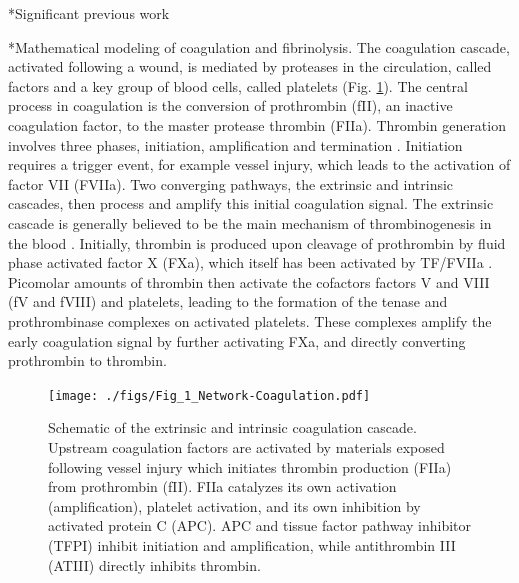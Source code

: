 \documentclass[11pt]{article}
\makeatletter
\renewcommand\subsection{\@startsection
	{subsection}{2}{0mm}
	{-0.05in}
	{-0.5\baselineskip}
	{\normalfont\normalsize\bfseries}}
\renewcommand\section{\@startsection
	{subsection}{2}{0mm}
	{-0.2in}
	{0.05\baselineskip}
	{\normalfont\large\bfseries}}
\makeatother
\begin{document}
\section*{Significant previous work}
\subsection*{Mathematical modeling of coagulation and fibrinolysis.}
The coagulation cascade, activated following a wound,
is mediated by proteases in the circulation, called factors and a key group of blood cells, called platelets (Fig. \ref{fig:fig-coagulation}).
The central process in coagulation is the conversion of prothrombin (fII), an inactive coagulation factor, to the master protease thrombin (FIIa).
Thrombin generation involves three phases, initiation, amplification and termination \cite{GOLDHABER2006, Brummel:2002aa}.
Initiation requires a trigger event, for example vessel injury, which leads to the activation of factor VII (FVIIa).
Two converging pathways, the extrinsic and intrinsic cascades, then process and amplify this initial coagulation signal.
The extrinsic cascade is generally believed to be the main mechanism of thrombinogenesis in the blood \cite{MANN1990,ROBERTS1998,MANN1999}.
Initially, thrombin is produced upon cleavage of prothrombin by fluid phase activated factor X (FXa), which itself has been activated by TF/FVIIa \cite{Butenas:2002aa}.
Picomolar amounts of thrombin then activate the cofactors factors V and VIII (fV and fVIII) and platelets,
leading to the formation of the tenase and prothrombinase complexes on activated platelets.
These complexes amplify the early coagulation signal by further activating FXa, and directly converting prothrombin to thrombin.

\begin{figure}
  \texttt{[image: ./figs/Fig\_1\_Network-Coagulation.pdf]}
  \caption{Schematic of the extrinsic and intrinsic coagulation cascade.
  Upstream coagulation factors are activated by materials exposed following vessel injury which initiates thrombin production (FIIa) from prothrombin (fII).
  FIIa catalyzes its own activation (amplification), platelet activation, and its own inhibition by activated protein C (APC).
  APC and tissue factor pathway inhibitor (TFPI) inhibit initiation and amplification, while antithrombin III (ATIII) directly inhibits thrombin. }\label{fig:fig-coagulation}
\end{figure}
\end{document}
